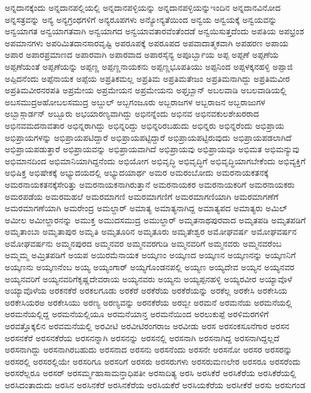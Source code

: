 {ಅನ್ನದಾನಕ್ಕೆಂದು
ಅನ್ನದಾನಪಲ್ಲಿಯಲ್ಲಿ
ಅನ್ನದಾನಪಳ್ಳಿಯನ್ನು
ಅನ್ನದಾನಪಳ್ಳಿಯನ್ನುಇಂದಿನ
ಅನ್ನದಾನವಿನೋದ
ಅನ್ನಸತ್ರವನ್ನು
ಅನ್ಯ
ಅನ್ಯಗ್ರಂಥಗಳಿಗೆ
ಅನ್ಯರೂಪಗಳು
ಅನ್ಯೋನ್ಯತೆಯಿಂದ
ಅನ್ವಯ
ಅನ್ವಯಕ್ಕೆ
ಅನ್ವಯವನ್ನು
ಅನ್ವಯಾಗತ
ಅನ್ವಯಾಗತವಾಗಿ
ಅನ್ವಯಾಗದ
ಅನ್ವಯಾವತಾರವೆಂತೆಂದಡೆ
ಅನ್ವಯಿಸುತ್ತದೆಂದು
ಅಪತಿಯ
ಅಪಭ್ರಂಶ
ಅಪಮಾನಗಳು
ಅಪರಿಮಿತದಾನಸಾರವೃಷ್ಟಿ
ಅಪರೂಪಕ್ಕೆ
ಅಪರೂಪದ
ಅಪವಾದಾತ್ಮಕವಾಗಿ
ಅಪಹರಣ
ಅಪಾಯ
ಅಪಾರ
ಅಪಾರಪ್ರಮಾಣದ
ಅಪಾರವಾಗಿ
ಅಪಾರವಾದ
ಅಪಾರಸೈನ್ಯ
ಅಪೂರ್ಬ್ಬಾಯ
ಅಪ್ಪ
ಅಪ್ಪಣೆ
ಅಪ್ಪಣೆಯ
ಅಪ್ಪಣೆಯಂತೆ
ಅಪ್ಪಣೆಯನ್ನು
ಅಪ್ಪಣ್ಣ
ಅಪ್ಪಣ್ಣನಾಯಕನು
ಅಪ್ಪಣ್ಣಭೂಪತಿಯು
ಅಪ್ಪನಿಂದ
ಅಪ್ಪಳಕ್ಕನಹಳ್ಳಿ
ಅಪ್ಪಾಜಿ
ಅಪ್ಪಿದನೆಂದು
ಅಪ್ಪೆನಾಯಕ
ಅಪ್ಪೆಯ
ಅಪ್ರತಿಕಮಲ್ಲ
ಅಪ್ರತಿಮ
ಅಪ್ರತಿಮತೇಜಂ
ಅಪ್ರತಿಮನಾಗಿದ್ದು
ಅಪ್ರತಿಮವೀರ
ಅಪ್ರತಿಮವೀರನರಪತಿ
ಅಪ್ರಮೇಯ
ಅಪ್ರಮೇಯನ
ಅಪ್ರಮೇಯನು
ಅಫ್ತಬ್ಖಾನ್
ಅಬಲವಾಡಿ
ಅಬಲವಾಡಿಯಲ್ಲಿ
ಅಬಸಮುದ್ರಅಹೋಬಲಸಮುದ್ರ
ಅಬ್ದುಲ್
ಅಬ್ಬಗಂಜೂರು
ಅಬ್ಬರಾಜಗಳ
ಅಬ್ಬರಾಜನ
ಅಬ್ಬರಾಜುಗಳ
ಅಬ್ಬಾಸ್ಗಾರ್ಡನ್
ಅಬ್ಬೂರು
ಅಭಯಾರಣ್ಯವಾಗಿದ್ದು
ಅಭಿನನ್ನೆಂದು
ಅಭಿನವ
ಅಭಿನವಕುಲಶೇಖರರಾದ
ಅಭಿನವಮದನಾವತಾರ
ಅಭಿನ್ನರಾಗಿದ್ದು
ಅಭಿನ್ನರಿದ್ದು
ಅಭಿನ್ನರಿರಬಹುದು
ಅಭಿನ್ನರು
ಅಭಿನ್ನರೆಂದು
ಅಭಿಪ್ರಾಯ
ಅಭಿಪ್ರಾಯಗಳನ್ನು
ಅಭಿಪ್ರಾಯಪಟಿದ್ದಾರೆ
ಅಭಿಪ್ರಾಯಪಟ್ಟಿದ್ದಾರೆ
ಅಭಿಪ್ರಾಯಪಟ್ಟಿರುವುದು
ಅಭಿಪ್ರಾಯಪಡಲಾಗಿದೆ
ಅಭಿಪ್ರಾಯಪಡುತ್ತಾರೆ
ಅಭಿಪ್ರಾಯವನ್ನು
ಅಭಿಪ್ರಾಯವಾಗಿದೆ
ಅಭಿಪ್ರಾಯವು
ಅಭಿಪ್ರಾಯವೂ
ಅಭಿಮತ
ಅಭಿಮನ್ಯುವು
ಅಭಿಮಾನದಿಂದ
ಅಭಿಮಾನಿಯಾಗಿದ್ದನೆಂದು
ಅಭಿಯೋಗ
ಅಭಿವೃದ್ಧಿ
ಅಭಿವೃದ್ಧಿಗೆ
ಅಭಿವೃದ್ಧಿಯಾಗಬೇಕೆಂದು
ಅಭಿವ್ಯಕ್ತಿಗೆ
ಅಭಿಷಿಕ್ತ
ಅಭಿಷೇಕಕ್ಕೆ
ಅಭ್ಯುದಯದಲ್ಲಿ
ಅಭ್ಯುದಯಾರ್ಥ
ಅಮರ
ಅಮರಂಬೋದು
ಅಮರನಾಯಕತನಕ್ಕೆ
ಅಮರನಾಯಕತನಕ್ಕೆಸೇರಿತ್ತು
ಅಮರನಾಯಕನಾಗಿರುತ್ತಾನೆ
ಅಮರನಾಯಕರ
ಅಮರನಾಯಕರಿಗೆ
ಅಮರನಾಯಕರು
ಅಮರಪಡೆಯ
ಅಮರಮಹಲೆ
ಅಮರಮಾಗಣಿ
ಅಮರಮಾಗಣಿಗೆ
ಅಮರಮಾಗಣಿಯಾಗಿ
ಅಮರಮಾಗಣೆಗೆ
ಅಮರಮಾಗಣೆಯಾಗಿ
ಅಮರೇಂದ್ರ
ಅಮಲ್ದಾರ್
ಅಮಾತ್ಯ
ಅಮಾತ್ಯನಾಗಿದ್ದ
ಅಮಾತ್ಯಪದ
ಅಮಾತ್ಯರು
ಅಮಿಲ್
ಅಮೀಲ
ಅಮೀಲ್ದಾರನನ್ನು
ಅಮುಕ್ತ
ಅಮುದಸಮುದ್ರ
ಅಮುಲ್ದಾರ್
ಅಮೃತನಾಥಪುರವಾದ
ಅಮೃತಪಡಿ
ಅಮೃತಪಡಿಗೆ
ಅಮೃತಾಂಬಾ
ಅಮೃತಾಪುರ
ಅಮೃತಿ
ಅಮೃತೂರಿನ
ಅಮೃತೂರು
ಅಮೃತೇಶ್ವರ
ಅಮೋಘವರ್ಷ
ಅಮೋಘವರ್ಷನ
ಅಮೋಘವರ್ಷನು
ಅಮ್ಮನಪುರದ
ಅಮ್ಮನವರ
ಅಮ್ಮನವರಗುಡಿ
ಅಮ್ಮನವರಿಗೆ
ಅಮ್ಮನವರು
ಅಮ್ಮನವರೆಂಬ
ಅಮ್ಮಮ್ಮ
ಅಮ್ರಿತಪಡಿಗೆ
ಅಯಪ
ಅಯಿರಮೆನಾಯಕ
ಅಯ್ಕಣಂ
ಅಯ್ಕಣದ
ಅಯ್ಕಣನ
ಅಯ್ಕಣನನ್ನು
ಅಯ್ಕಣನಿಗೆ
ಅಯ್ಕಣನು
ಅಯ್ಕಣನೆಂಬ
ಅಯ್ಯ
ಅಯ್ಯಂಗಾರ್
ಅಯ್ಯಗೊಂಡನಪಲ್ಲಿ
ಅಯ್ಯಣ
ಅಯ್ಯದೇವ
ಅಯ್ಯನ
ಅಯ್ಯನವರ
ಅಯ್ಯನವರಿಗೆ
ಅಯ್ಯನವರಿಗೆಕೃಷ್ಣದೇವರಾಯ
ಅಯ್ಯನವರು
ಅಯ್ಯನು
ಅಯ್ಯಪ್ಪನಹಳ್ಳಿ
ಅಯ್ಯರವೀರ
ಅಯ್ಯಾವೊಳೆ
ಅಯ್ಯಾವೊಳೆಯ
ಅರಕನಕೆರೆ
ಅರಕಲಗೂಡು
ಅರಕೆರೆ
ಅರಕೆರೆಯ
ಅರಕೆರೆಯನ್ನು
ಅರಕೆಲ್ಲ
ಅರಕೇಸಿ
ಅರಕೇಸಿಯ
ಅರಕೇಸಿಯರಅ
ಅರಕೇಸಿಯು
ಅರಣ್ಯ
ಅರಣ್ಯವನ್ನು
ಅರನಕೆರೆಯ
ಅರಬ್ಬೀ
ಅರಮನೆ
ಅರಮನೆಯ
ಅರಮನೆಯಲ್ಲಿ
ಅರಮನೆಯಲ್ಲಿದ್ದ
ಅರಮನೆಯಲ್ಲಿಯೂ
ಅರಮನೆಯಾನ್ತ
ಅರಮನೆಯಿಂದ
ಅರಲುಕುಪ್ಪೆ
ಅರಳಿಮರಗಳಿಗೆ
ಅರವತ್ತೊಕ್ಕಲಿನ
ಅರವಮನೆಯಲ್ಲಿ
ಅರವೀಟಿ
ಅರವೀಟಿರಂಗರಾಜ
ಅರವೀಡು
ಅರಸ
ಅರಸಂಕಸೂನೆಗಾರ
ಅರಸನ
ಅರಸನಕೆರೆ
ಅರಸನಕೆರೆಯ
ಅರಸನನ್ನಾಗಿ
ಅರಸನನ್ನು
ಅರಸನಲ್ಲಿ
ಅರಸನಾಗಿ
ಅರಸನಾಗಿದ್ದ
ಅರಸನಾಗಿದ್ದಲ್ಲದೆ
ಅರಸನಾಗಿದ್ದು
ಅರಸನಾಗಿರಬಹುದು
ಅರಸನಾದ
ಅರಸನು
ಅರಸನೆಂದು
ಅರಸನೇ
ಅರಸನೋ
ಅರಸರ
ಅರಸರನ್ನು
ಅರಸರಲ್ಲಿ
ಅರಸರಲ್ಲಿಯೇ
ಅರಸರಿಗೂ
ಅರಸರಿಗೆ
ಅರಸರು
ಅರಸರುಗಳು
ಅರಸರುಮಣಲೇರ
ಅರಸರೂ
ಅರಸರೆಂದು
ಅರಸರೆಲ್ಲರೂ
ಅರಸರ್
ಅರಸರ್ಮ್ಮಹಾಸಾಮನ್ತಾಧಿಪತೀ
ಅರಸಾದಿತ್ಯ
ಅರಸಿ
ಅರಸಿಕೆರೆ
ಅರಸಿಕೆರೆಯ
ಅರಸಿಕೆರೆಯಲ್ಲಿ
ಅರಸಿದಂತಾದುದು
ಅರಸಿನ
ಅರಸಿನಕೆರೆ
ಅರಸಿನಕೆರೆಯ
ಅರಸಿಯಕೆರೆ
ಅರಸಿಯಕೆರೆಯ
ಅರಸೀಕೆರೆ
ಅರಸು
ಅರಸುಗಂಡ
}
